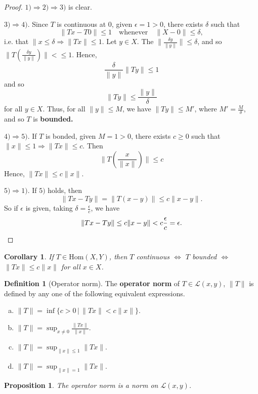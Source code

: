\documentclass[10pt, oneside, reqno]{amsart}
\theoremstyle{plain}%
\newtheorem{prop}[thm]{Proposition}
\newtheorem*{cor}{Corollary}
\theoremstyle{definition}
\newtheorem{defn}[thm]{Definition}
\theoremstyle{remark}
\begin{document}
\begin{proof}
	$1) \Rightarrow 2) \Rightarrow 3)$ is clear.
	
	$3) \Rightarrow 4)$.  Since $T$ is continuous at 0, given $\epsilon = 1 > 0$, there exists $\delta$ such that \[
		\| Tx - T0 \| \leq 1 \quad \text{whenever} \quad \| X - 0 \| \leq \delta,
	\] i.e. that $\| x \leq \delta \Rightarrow \| Tx \| \leq 1$.  Let $y \in X$.  The $\| \frac{\delta y}{\| y \|} \| \leq \delta$, and so $\| T\left( \frac{\delta y}{\| y \|} \right) \| < \leq 1$.  Hence, \[
		\frac{\delta}{\|y \|} \|T y \| \leq 1
	\] and so \[
		\|Ty \| \leq \frac{ \| y \|}{\delta}
	\] for all $y \in X$.  Thus, for all $\| y \| \leq M$, we have $\| Ty \| \leq M'$, where $M' = \frac{M}{\delta}$, and so $T$ is \textbf{bounded.} 
	
	$4) \Rightarrow 5)$.  If $T$ is bonded, given $M = 1 > 0$, there exists $c \geq 0$ such that $\| x \| \leq 1 \Rightarrow \|T x \| \leq c$.  Then \[
		 \|T \left( \frac{x}{\|x \|} \right) \| \leq c	\] 
		Hence, $\|Tx \| \leq c \| x \|$.  
		
	$5) \Rightarrow 1)$.  If $5)$ holds, then  \[
		\| Tx - Ty \| = \| T(x-y) \| \leq c \| x - y \|.
	\]  So if $\epsilon$ is given, taking $\delta = \frac{\epsilon}{c}$, we have \[
		\|Tx - Ty \| \leq c \| x - y \| < c \frac{\epsilon}{c} = \epsilon. \qedhere
	\]
\end{proof}

\begin{cor}
	If $T \in \text{Hom}(X,Y)$, then $T$ continuous $\iff$ $T$ bounded $\iff$ $\|Tx \| \leq c \| x \|$ for all $x \in X$.
\end{cor}

\begin{defn}[Operator norm]
	The \textbf{operator norm} of $T \in \mathcal{L}(x,y)$, $\| T\|$ is defined by any one of the following equivalent expressions.
	\begin{enumerate}[(a)]
		\item $\|T \| = \inf \{ c > 0 \, | \, \| Tx \| < c \| x \| \}$.
		\item $\| T\| = \sup_{x \neq 0} \frac{ \|Tx \|}{\| x \|}$.
		\item $\| T \| = \sup_{ \|x \| \leq 1} \| Tx \|$.
		\item $\| T \| = \sup_{\| x \| = 1} \|T x \|$.
	\end{enumerate}
\end{defn}

\begin{prop}
	The operator norm is a norm on $\mathcal{L}(x,y)$.  
\end{prop}
\end{document}
